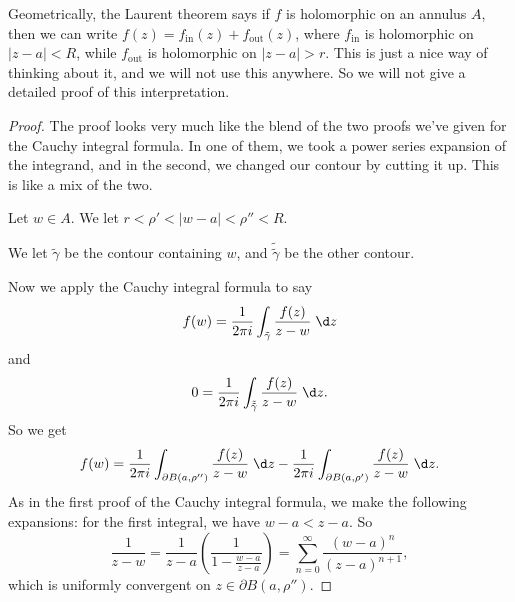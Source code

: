 \documentclass[a4paper]{article}
\begin{document}
Geometrically, the Laurent theorem says if $f$ is holomorphic on an annulus $A$, then we can write $f(z) = f_{\mathrm{in}}(z) + f_{\mathrm{out}}(z)$, where $f_{\mathrm{in}}$ is holomorphic on $|z - a| < R$, while $f_{\mathrm{out}}$ is holomorphic on $|z - a| > r$. This is just a nice way of thinking about it, and we will not use this anywhere. So we will not give a detailed proof of this interpretation.

\begin{proof}
  The proof looks very much like the blend of the two proofs we've given for the Cauchy integral formula. In one of them, we took a power series expansion of the integrand, and in the second, we changed our contour by cutting it up. This is like a mix of the two.

  Let $w \in A$. We let $r < \rho' < | w- a| < \rho'' < R$.
  \begin{center}
  \end{center}
  We let $\tilde{\gamma}$ be the contour containing $w$, and $\tilde{\tilde{\gamma}}$ be the other contour.

  Now we apply the Cauchy integral formula to say
  \[
    f(w) = \frac{1}{2\pi i} \int_{\tilde{\gamma}}\frac{f(z)}{z - w}\;\d z
  \]
  and
  \[
    0 = \frac{1}{2\pi i} \int_{\tilde{\tilde{\gamma}}} \frac{f(z)}{z - w} \;\d z.
  \]
  So we get
  \[
    f(w) = \frac{1}{2\pi i} \int_{\partial B(a, \rho'')} \frac{f(z)}{z - w}\;\d z - \frac{1}{2\pi i} \int_{\partial B(a, \rho')} \frac{f(z)}{z - w}\;\d z.
  \]
  As in the first proof of the Cauchy integral formula, we make the following expansions: for the first integral, we have $w - a < z - a$. So
  \[
    \frac{1}{z - w} = \frac{1}{z - a} \left(\frac{1}{1 - \frac{w - a}{z - a}}\right) = \sum_{n = 0}^\infty \frac{(w - a)^n}{(z - a)^{n + 1}},
  \]
  which is uniformly convergent on $z \in \partial B(a, \rho'')$.


\end{proof}
\end{document}
